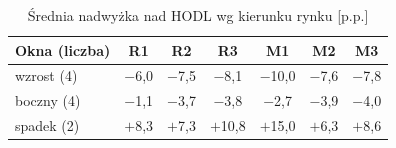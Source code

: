 \begin{table}[ht]
\centering
\caption{Średnia nadwyżka nad HODL wg kierunku rynku [p.p.]}
\label{tab:trend-nadwyzka}
\small
\begin{tabular}{|l|c|c|c|c|c|c|}
\hline
\textbf{Okna (liczba)} & \textbf{R1} & \textbf{R2} & \textbf{R3} & \textbf{M1} & \textbf{M2} & \textbf{M3} \\ \hline
wzrost (4) & $-$6{,}0 & $-$7{,}5 & $-$8{,}1 & $-$10{,}0 & $-$7{,}6 & $-$7{,}8 \\ \hline
boczny (4) & $-$1{,}1 & $-$3{,}7 & $-$3{,}8 & $-$2{,}7 & $-$3{,}9 & $-$4{,}0 \\ \hline
spadek (2) & $+$8{,}3 & $+$7{,}3 & $+$10{,}8 & $+$15{,}0 & $+$6{,}3 & $+$8{,}6 \\ \hline
\end{tabular}
\end{table}
